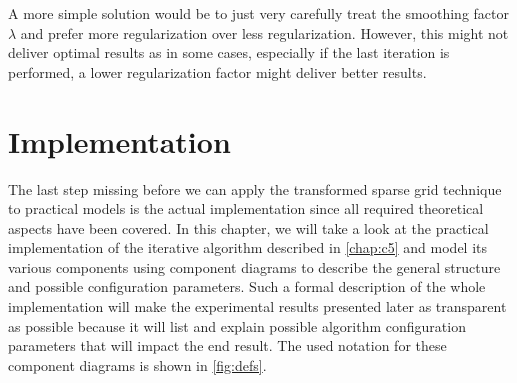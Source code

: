 \documentclass[
  a4paper,  %
  twoside,  %
  bibliography=totoc,
  headsepline,
  cleardoublepage=empty,
  parskip=half,
  draft=false
]{scrbook}
\begin{document}
A more simple solution would be to just very carefully treat the smoothing factor $\lambda$ and prefer more regularization over less regularization.
However, this might not deliver optimal results as in some cases, especially if the last iteration is performed, a lower regularization factor might deliver better results.

\chapter{Implementation}
\label{chap:c6}

The last step missing before we can apply the transformed sparse grid technique to practical models is the actual implementation since all required theoretical aspects have been covered.
In this chapter, we will take a look at the practical implementation of the iterative algorithm described in \cref{chap:c5} and model its various components using component diagrams to describe the general structure and possible configuration parameters.
Such a formal description of the whole implementation will make the experimental results presented later as transparent as possible because it will list and explain possible algorithm configuration parameters that will impact the end result.
The used notation for these component diagrams is shown in \cref{fig:defs}.
\end{document}
